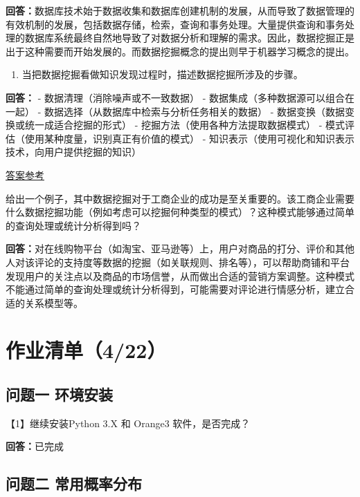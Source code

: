 \documentclass[11pt]{article}
\providecommand{\tightlist}{%
      \setlength{\itemsep}{0pt}\setlength{\parskip}{0pt}}
\begin{document}
    \textbf{回答：}数据库技术始于数据收集和数据库创建机制的发展，从而导致了数据管理的有效机制的发展，包括数据存储，检索，查询和事务处理。大量提供查询和事务处理的数据库系统最终自然地导致了对数据分析和理解的需求。因此，数据挖掘正是出于这种需要而开始发展的。而数据挖掘概念的提出则早于机器学习概念的提出。

    \begin{enumerate}
\def\labelenumi{(\alph{enumi})}
\setcounter{enumi}{3}
\tightlist
\item
  当把数据挖掘看做知识发现过程时，描述数据挖掘所涉及的步骤。
\end{enumerate}

    \textbf{回答：} - 数据清理（消除噪声或不一致数据） -
数据集成（多种数据源可以组合在一起） -
数据选择（从数据库中检索与分析任务相关的数据） -
数据变换（数据变换或统一成适合挖掘的形式） -
挖掘方法（使用各种方法提取数据模式） -
模式评估（使用某种度量，识别真正有价值的模式） -
知识表示（使用可视化和知识表示技术，向用户提供挖掘的知识）

    \href{https://www.coursehero.com/file/25032116/Data-Mining-Lab-1-Answerdocx/}{答案参考}

    给出一个例子，其中数据挖掘对于工商企业的成功是至关重要的。该工商企业需要什么数据挖掘功能（例如考虑可以挖掘何种类型的模式）？这种模式能够通过简单的查询处理或统计分析得到吗？

    \textbf{回答：}对在线购物平台（如淘宝、亚马逊等）上，用户对商品的打分、评价和其他人对该评论的支持度等数据的挖掘（如关联规则、排名等），可以帮助商铺和平台发现用户的关注点以及商品的市场信誉，从而做出合适的营销方案调整。这种模式不能通过简单的查询处理或统计分析得到，可能需要对评论进行情感分析，建立合适的关系模型等。

    \hypertarget{ux4f5cux4e1aux6e05ux5355422}{%
\section{作业清单（4/22）}\label{ux4f5cux4e1aux6e05ux5355422}}

    \hypertarget{ux95eeux9898ux4e00-ux73afux5883ux5b89ux88c5}{%
\subsection{问题一
环境安装}\label{ux95eeux9898ux4e00-ux73afux5883ux5b89ux88c5}}

    【1】继续安装Python 3.X 和 Orange3 软件，是否完成？

    \textbf{回答：}已完成

    \hypertarget{ux95eeux9898ux4e8c-ux5e38ux7528ux6982ux7387ux5206ux5e03}{%
\subsection{问题二
常用概率分布}\label{ux95eeux9898ux4e8c-ux5e38ux7528ux6982ux7387ux5206ux5e03}}
\end{document}
